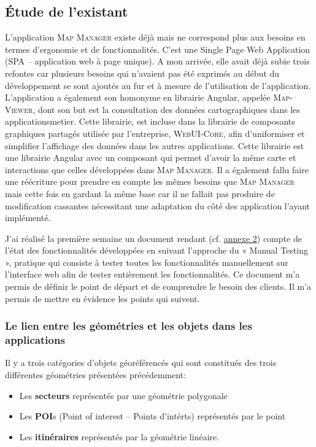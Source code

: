 \documentclass{rapportUHA40}
\begin{document}
\subsection{Étude de l'existant}
L'application \textsc{Map Manager} existe déjà mais ne correspond plus aux
besoins en termes d'ergonomie et de fonctionnalités. C'est une Single Page Web
Application (SPA – application web à page unique). A mon arrivée, elle avait
déjà subie trois refontes car plusieurs besoins qui n'avaient pas été exprimés
au début du développement se sont ajoutés au fur et à mesure de l'utilisation
de l'application. \\

L'application a également son homonyme en librairie Angular, appelée
\textsc{Map-Viewer}, dont son but est la consultation des données
cartographiques dans les \gls{applicationsmetier}. Cette librairie, est incluse
dans la librairie de composants graphiques partagés utilisée par l'entreprise,
\textsc{WebUI-Core}, afin d'uniformiser et simplifier l'affichage des données
dans les autres applications. Cette librairie est une librairie Angular avec un
composant qui permet d'avoir la même carte et interactions que celles
développées dans \textsc{Map Manager}. Il a également fallu faire une
réécriture pour prendre en compte les mêmes besoins que \textsc{Map Manager}
mais cette fois en gardant la même base car il ne fallait pas produire de
modification cassantes nécessitant une adaptation du côté des application
l'ayant implémenté.

J’ai réalisé la première semaine un document rendant (cf.
\hyperlink{ANNEX2}{annexe 2}) compte de l’état des fonctionnalités développées
en suivant l’approche du « Manual Testing », pratique qui consiste à tester
toutes les fonctionnalités manuellement sur l’interface web afin de tester
entièrement les fonctionnalités. Ce document m’a permis de définir le point de
départ et de comprendre le besoin des clients. Il m'a permis de mettre en
évidence les points qui suivent.

\subsubsection{Le lien entre les géométries et les objets dans les applications}
Il y a trois catégories d'objets géoréférencés qui sont constitués des trois
différentes géométries présentées précédemment:
\begin{itemize}
  \item Les \textbf{secteurs} représentés par une géométrie polygonale
  \item Les \textbf{POI}s (Point of interest – Points d'intérts) représentés par le
        point
  \item Les \textbf{itinéraires} représentés par la géométrie linéaire. \\
\end{itemize}
\end{document}
